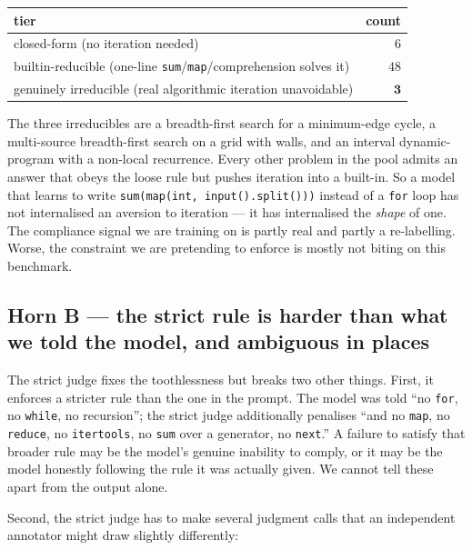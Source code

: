 \documentclass[11pt]{article}
\begin{document}
\begin{center}
\begin{tabular}{lr}
\toprule
tier                                                 & count \\
\midrule
closed-form (no iteration needed)                     & $6$  \\
builtin-reducible (one-line \texttt{sum}/\texttt{map}/comprehension solves it) & $48$ \\
genuinely irreducible (real algorithmic iteration unavoidable)             & $\mathbf{3}$ \\
\bottomrule
\end{tabular}
\end{center}

\noindent
The three irreducibles are a breadth-first search for a minimum-edge
cycle, a multi-source breadth-first search on a grid with walls, and an
interval dynamic-program with a non-local recurrence. Every other problem
in the pool admits an answer that obeys the loose rule but pushes
iteration into a built-in. So a model that learns to write
\texttt{sum(map(int, input().split()))} instead of a \texttt{for} loop
has not internalised an aversion to iteration --- it has internalised the
\emph{shape} of one. The compliance signal we are training on is partly
real and partly a re-labelling. Worse, the constraint we are pretending
to enforce is mostly not biting on this benchmark.

\subsection*{Horn B --- the strict rule is harder than what we told the model, and ambiguous in places}

The strict judge fixes the toothlessness but breaks two other things.
First, it enforces a stricter rule than the one in the prompt. The model
was told ``no \texttt{for}, no \texttt{while}, no recursion''; the strict
judge additionally penalises ``and no \texttt{map}, no \texttt{reduce},
no \texttt{itertools}, no \texttt{sum} over a generator, no
\texttt{next}.'' A failure to satisfy that broader rule may be the
model's genuine inability to comply, or it may be the model honestly
following the rule it was actually given. We cannot tell these apart
from the output alone.

Second, the strict judge has to make several judgment calls that an
independent annotator might draw slightly differently:
\end{document}
